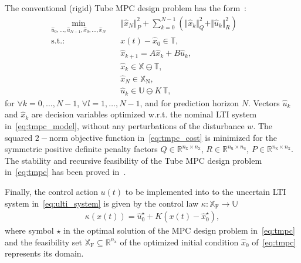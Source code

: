 \documentclass[letterpaper, 10 pt, conference]{ieeeconf}
\begin{document}
	The conventional (rigid) Tube MPC design problem has the form~\cite{MS05}:
	\begin{subequations}
		\label{eq:tmpc}
		\begin{eqnarray}
			\label{eq:tmpc_cost}
			\min_{\hat{u}_{0},\ldots,\hat{u}_{N-1}, \hat{x}_{0},\ldots,\hat{x}_{N} } \!\!\!\!\!\!\!\!\!\!\! &\,& \Vert \hat{x}_{N} \Vert_{P}^{2} + \sum_{k=0}^{N-1} \left( \Vert \hat{x}_{k} \Vert_{Q}^{2} + \Vert \hat{u}_{k} \Vert_{R}^{2} \right) \qquad \\
			\label{eq:tmpc_rpi}
			\mathrm{s.t.\!:} &\,& x(t) - \hat{x}_{0} \in \mathbb{T} , \\
			\label{eq:tmpc_model}
			&\,&  \hat{x}_{k+1} = A \hat{x}_{k} + B \hat{u}_{k} , \\
			\label{eq:tmpc_constraints_state}
			&\,& \hat{x}_{k} \in \mathbb{X} \ominus \mathbb{T} , \\
			\label{eq:tmpc_constraints_terminal}
			&\,& \hat{x}_{N} \in \mathbb{X}_{\mathrm{N}}, \\
			\label{eq:tmpc_constraints_input}
			&\,& \hat{u}_{k} \in \mathbb{U} \ominus K \, \mathbb{T} , 
		\end{eqnarray}
	\end{subequations}
	for $\forall k = 0, \dots, N-1$,  $\forall l = 1, \dots, N-1$, and for prediction horizon $N$. Vectors $\hat{u}_{k}$ and $\hat{x}_{k}$ are decision variables optimized w.r.t. the nominal LTI system in~\eqref{eq:tmpc_model}, without any perturbations of the disturbance $w$. 
	The squared $2-$norm objective function in~\eqref{eq:tmpc_cost} is minimized for the symmetric positive definite penalty factors $Q \in \mathbb{R}^{n_{\mathrm{x}} \times n_{\mathrm{x}}}$, $R \in \mathbb{R}^{n_{\mathrm{u}} \times n_{\mathrm{u}}}$, $P \in \mathbb{R}^{n_{\mathrm{x}} \times n_{\mathrm{x}}}$. 
	The stability and recursive feasibility of the Tube MPC design problem in~\eqref{eq:tmpc} has been proved in~\cite{MS05}.
	
	Finally, the control action $u(t)$ to be implemented into to the uncertain LTI system in~\eqref{eq:ulti_system} is given by the control law $\kappa : \mathbb{X}_{\mathrm{F}} \rightarrow \mathbb{U}$
	\begin{eqnarray}
		\label{eq:tmpc_control_law}
		\kappa(x(t)) = \hat{u}_{0}^{\star} + K \left( x(t) - \hat{x}_{0}^{\star} \right),
	\end{eqnarray}
	where symbol $\star$ in the optimal solution of the MPC design problem in~\eqref{eq:tmpc} and the feasibility set $\mathbb{X}_{\mathrm{F}} \subseteq \mathbb{R}^{n_{\mathrm{x}}}$ of the optimized initial condition $\hat{x}_{0}$ of~\eqref{eq:tmpc} represents its domain. 
	
\end{document}
